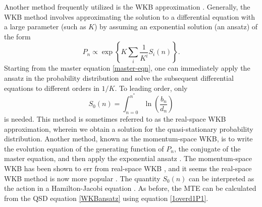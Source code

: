 Another method frequently utilized is the WKB approximation \cite{Doering2005,Assaf2006,Kessler2007,Kamenev2008,Assaf2010,Ovaskainen2010,Gottesman2012,Assaf2016,Yu2017}. 
Generally, the WKB method involves approximating the solution to a differential equation with a large parameter (such as $K$) by assuming an exponential solution (an ansatz) of the form \cite{Assaf2016}
\begin{equation}
P_n \propto \exp \left\{ K \sum_i \frac{1}{K^i}S_i(n) \right\}.
 \label{WKBansatz}
\end{equation}
Starting from the master equation \ref{master-eqn}, one can immediately apply the ansatz in the probability distribution and solve the subsequent differential equations to different orders in $1/K$\cite{Assaf2016}.%
To leading order, only 
\begin{equation}
S_0(n) = \int_{n=0}^{n^*} \ln\left(\frac{b_n}{d_n}\right)
 \label{WKBaction}
\end{equation}
is needed. 
This method is sometimes referred to as the real-space WKB approximation, wherein we obtain a solution for the quasi-stationary probability distribution.
Another method, known as the momentum-space WKB, is to write the evolution equation of the generating function of $P_n$, the conjugate of the master equation, and then apply the exponential ansatz \cite{Assaf2006,Assaf2016}. 
The momentum-space WKB has been shown to err from real-space WKB \cite{Ovaskainen2010,Assaf2016}, and it seems the real-space WKB method is now more popular \cite{Kessler2007,Kamenev2008,Assaf2010,Ovaskainen2010,Gottesman2012,Assaf2016,Yu2017}. 
The quantity $S_0(n)$ can be interpreted as the action in a Hamilton-Jacobi equation \cite{Assaf2016}. 
As before, the MTE can be calculated from the QSD equation \ref{WKBansatz} using equation \ref{1overd1P1}. 

